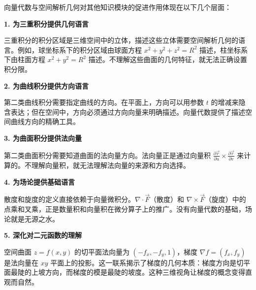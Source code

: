 \begin{connectionbox}
向量代数与空间解析几何对其他知识模块的促进作用体现在以下几个层面：

\textbf{1. 为三重积分提供几何语言}

三重积分的积分区域是三维空间中的立体，描述这些立体需要空间解析几何的语言。例如，球坐标系下的积分区域由球面方程 $x^2+y^2+z^2=R^2$ 描述，柱坐标系下由柱面方程 $x^2+y^2=R^2$ 描述。不理解这些曲面的几何特征，就无法正确设置积分限。

\textbf{2. 为曲线积分提供方向语言}

第二类曲线积分需要指定曲线的方向。在平面上，方向可以用参数 $t$ 的增减来隐含表达；但在空间中，方向必须通过方向向量来明确描述。向量代数提供了描述空间曲线方向的精确工具。

\textbf{3. 为曲面积分提供法向量}

第二类曲面积分需要知道曲面的法向量方向。法向量正是通过向量积 $\frac{\partial\vec{r}}{\partial u}\times\frac{\partial\vec{r}}{\partial v}$ 来计算的。不理解向量积，就无法理解法向量的来源和方向选择。

\textbf{4. 为场论提供基础语言}

散度和旋度的定义直接依赖于向量微积分。$\nabla\cdot\vec{F}$（散度）和 $\nabla\times\vec{F}$（旋度）中的点乘和叉乘，正是数量积和向量积在微分算子上的推广。没有向量代数的基础，场论就是无源之水。

\textbf{5. 深化对二元函数的理解}

空间曲面 $z=f(x,y)$ 的切平面法向量为 $(-f_x, -f_y, 1)$，梯度 $\nabla f = (f_x, f_y)$ 是法向量在 $xy$ 平面上的投影。这一联系揭示了梯度的几何本质：梯度方向是切平面最陡的上坡方向，而梯度的模是最陡的坡度。这种三维视角让梯度的概念变得直观而自然。
\end{connectionbox}
